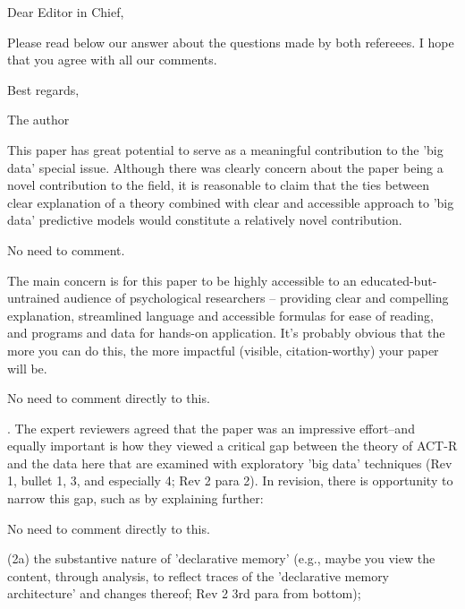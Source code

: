 \documentclass[answers,12pt]{exam}
\begin{document}
Dear Editor in Chief, \bigskip

Please read below our answer about the \numquestions{}
questions made by  both refereees. I hope that you agree
with all our comments. \bigskip

Best regards,\bigskip

The author


\begin{questions}

\question This paper has great potential to serve as a meaningful contribution to the 'big data' special issue. Although there was clearly concern about the paper being a novel contribution to the field, it is reasonable to claim that the ties between clear explanation of a theory combined with clear and accessible approach to 'big data' predictive models would constitute a relatively novel contribution.

\begin{solution}
No need to comment.
\end{solution}

\question The main concern is for this paper to be highly accessible to an educated-but-untrained audience of psychological researchers -- providing clear and compelling explanation, streamlined language and accessible formulas for ease of reading, and programs and data for hands-on application. It's probably obvious that the more you can do this, the more impactful (visible, citation-worthy) your paper will be.

\begin{solution}
No need to comment directly to this.
\end{solution}

. The expert reviewers agreed that the paper was an impressive effort--and equally important is how they viewed a critical gap between the theory of ACT-R and the data here that are examined with exploratory 'big data' techniques (Rev 1, bullet 1, 3, and especially 4; Rev 2 para 2). In revision, there is opportunity to narrow this gap, such as by explaining further:

\begin{solution}
No need to comment directly to this.
\end{solution}

\question (2a) the substantive nature of 'declarative memory' (e.g., maybe you view the content, through analysis, to reflect traces of the 'declarative memory architecture' and changes thereof; Rev 2 3rd para from bottom);


\end{questions}
\end{document}
